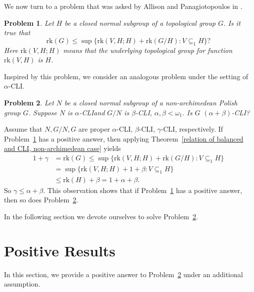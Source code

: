 \documentclass[11pt]{amsart}
\newtheorem{problem}{Problem}
\theoremstyle{definition}
\theoremstyle{remark}
\numberwithin{equation}{section}
\def\hier#1{$#1$-CLI}
\def\rk{\mathrm{rk}}
\begin{document}
We now turn to a problem that was asked by Allison and Panagiotopoulos in \cite{SAllisonAPana}.
\begin{problem}\label{problem of SP}
    Let $H$ be a closed normal subgroup of a topological group $G$. Is it true that
    \begin{equation*}
        \rk(G)\leq\sup\{\rk(V,H;H)+\rk(G/H):V\subseteq_1H\}?
    \end{equation*}
Here $\rk(V,H;H)$ means that the underlying topological group for function $\rk(V,H)$ is $H$.
\end{problem}
Inspired by this problem, we consider an analogous problem under the setting of \hier\alpha.
\begin{problem}\label{problem of DW}
    Let $N$ be a closed normal subgroup of a non-archimedean Polish group $G$. Suppose $N$ is \hier\alpha\space and $G/N$ is \hier\beta, $\alpha,\beta<\omega_1$. Is $G$ \hier{(\alpha+\beta)}?
\end{problem}
Assume that $N,G/N,G$ are proper \hier\alpha, \hier\beta, \hier\gamma, respectively. If Problem~\ref{problem of SP} has a positive answer, then applying Theorem~\ref{relation of balanced and CLI, non-archimedean case} yields
\begin{align*}
    1+\gamma&=\rk(G)\leq\sup\{\rk(V,H;H)+\rk(G/H):V\subseteq_1H\}\\
    &=\sup\{\rk(V,H;H)+1+\beta:V\subseteq_1H\}\\
    &\leq\rk(H)+\beta=1+\alpha+\beta.
\end{align*}
So $\gamma\leq\alpha+\beta$. This observation shows that if Problem~\ref{problem of SP} has a positive answer, then so does Problem~\ref{problem of DW}.

In the following section we devote ourselves to solve Problem~\ref{problem of DW}.

\section{Positive Results}\label{Examples and counterexamples}

In this section, we provide a positive answer to Problem~\ref{problem of DW} under an additional assumption.
\end{document}
